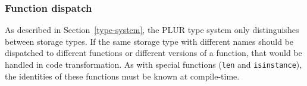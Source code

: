 \documentclass[10pt, conference, compsocconf]{IEEEtran}
\begin{document}
\subsubsection{Function dispatch}

As described in Section~\ref{type-system}, the PLUR type system only distinguishes between storage types. If the same storage type with different names should be dispatched to different functions or different versions of a function, that would be handled in code transformation. As with special functions ({\tt len} and {\tt isinstance}), the identities of these functions must be known at compile-time.






\end{document}
